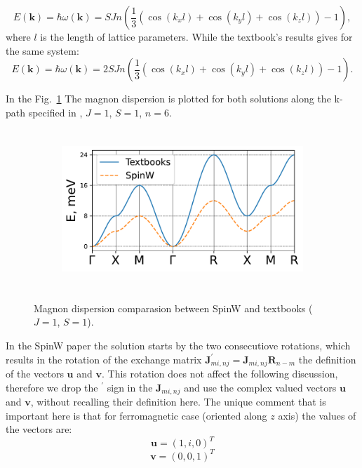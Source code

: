 \documentclass[a4paper,12pt]{article}
\begin{document}
        \begin{equation}
            E(\boldsymbol{k}) = \hbar\omega(\boldsymbol{k}) = SJn\left(\dfrac{1}{3}\left(\cos(k_xl) + \cos(k_yl) + \cos(k_zl)\right) - 1\right),
        \end{equation}
        where $l$ is the length of lattice parameters. While the textbook's results gives for the same system:
        \begin{equation}
            E(\boldsymbol{k}) = \hbar\omega(\boldsymbol{k}) = 2SJn\left(\dfrac{1}{3}\left(\cos(k_xl) + \cos(k_yl) + \cos(k_zl)\right) - 1\right). \label{eq:textbook}
        \end{equation}

        In the Fig.~\ref{fig:dispersion-comparasion} The magnon dispersion is plotted for both solutions along the k-path specified in \cite{setyawan2010high}, $J = 1$, $S = 1$, $n = 6$.

        \begin{figure}[H]
            \centering
            \begin{subfigure}[b]{0.8\textwidth}
                \centering
                \includegraphics[height=6cm]{main_dispersion.pdf}
            \end{subfigure}
            \hfill
            \caption{Magnon dispersion comparasion between SpinW and textbooks ($J = 1$, $S = 1$).}
            \label{fig:dispersion-comparasion}
        \end{figure}

        In the SpinW paper \cite{toth2015linear} the solution starts by the two consecutiove rotations, 
        which results in the rotation of the exchange matrix $\boldsymbol{J}^{\prime}_{mi, nj} = \boldsymbol{J}_{mi, nj}\boldsymbol{R}_{n-m}$ 
        the definition of the vectors $\boldsymbol{u}$ and $\boldsymbol{v}$.
        This rotation does not affect the following discussion, therefore we drop the $^{\prime}$ sign in the $\boldsymbol{J}_{mi, nj}$ 
        and use the complex valued vectors $\boldsymbol{u}$ and $\boldsymbol{v}$, without recalling their definition here. 
        The unique comment that is important here is that for ferromagnetic case (oriented along $z$ axis) the values of the vectors are:
        \begin{equation}
            \boldsymbol{u} = (1, i, 0)^T
        \end{equation}
        \begin{equation}
            \boldsymbol{v} = (0, 0, 1)^T
        \end{equation}
\end{document}
